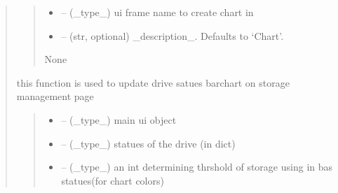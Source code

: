 \documentclass[letterpaper,10pt,english]{sphinxmanual}
\begin{document}
\begin{quote}
\begin{savenotes}
\begin{fulllineitems}
\begin{quote}
\begin{description}
\begin{itemize}
\item {} 
\sphinxAtStartPar
{} – (\_type\_) ui frame name to create chart in

\item {} 
\sphinxAtStartPar
{} – (str, optional) \_description\_. Defaults to ‘Chart’.

\end{itemize}

\sphinxAtStartPar
None

\end{description}\end{quote}

\end{fulllineitems}\end{savenotes}


\begin{savenotes}\begin{fulllineitems}
\label{\detokenize{setting/backend/chart_funcs:oxin.backend.chart_funcs.update_drive_barchart}}
\pysigstartsignatures
{}
\pysigstopsignatures
\sphinxAtStartPar
this function is used to update drive satues barchart on storage management page
\begin{quote}\begin{description}
\begin{itemize}
\item {} 
\sphinxAtStartPar
{} – (\_type\_) main ui object

\item {} 
\sphinxAtStartPar
{} – (\_type\_) statues of the drive (in dict)

\item {} 
\sphinxAtStartPar
{} – (\_type\_) an int determining thrshold of storage using in bas statues(for chart colors)


\end{itemize}
\end{description}
\end{quote}
\end{fulllineitems}
\end{savenotes}
\end{quote}
\end{document}
